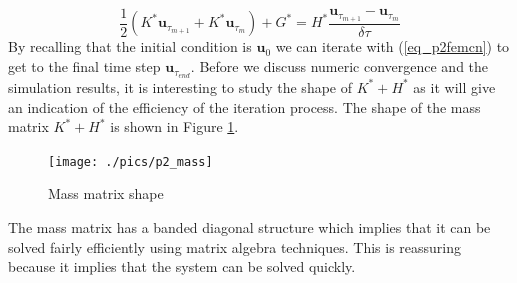 \documentclass[11pt,fleqn]{article}
\theoremstyle{defstyle}
\begin{document}
\begin{equation}
\frac{1}{2}\left(K^*\mathbf{u}_{\tau_{m+1}} +K^*\mathbf{u}_{\tau_{m}}\right) + G^* = H^*\frac{\mathbf{u}_{\tau_{m+1}}-\mathbf{u}_{\tau_{m}}}{\delta \tau}
\label{eq_p2femcn}
\end{equation}
By recalling that the initial condition is $\mathbf{u}_0$ we can iterate with (\ref{eq_p2femcn}) to get to the final time step $\mathbf{u}_{\tau_{end}}$. Before we discuss numeric convergence and the simulation results, it is interesting to study the shape of $K^* + H^*$ as it will give an indication of the efficiency of the iteration process. The shape of the mass matrix $K^* + H^*$ is shown in Figure \ref{fig_p2mass}.
\begin{figure}[H] 
\centering
\texttt{[image: ./pics/p2\_mass]}
\caption{Mass matrix shape} 
\label{fig_p2mass}
\end{figure}
The mass matrix has a banded diagonal structure which implies that it can be solved fairly efficiently using matrix algebra techniques. This is reassuring because it implies that the system can be solved quickly. 
\end{document}
